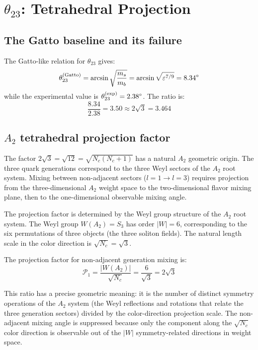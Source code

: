 ﻿\documentclass[prd,twocolumn,showpacs,superscriptaddress,groupedaddress]{revtex4-2}
\begin{document}
\section{$\theta_{23}$: Tetrahedral Projection}

\subsection{The Gatto baseline and its failure}

The Gatto-like relation for $\theta_{23}$ gives:
\begin{equation}
\theta_{23}^{(\rm Gatto)} = \arcsin\sqrt{\frac{m_s}{m_b}} = \arcsin\sqrt{\varepsilon^{7/9}} = 8.34^\circ
\end{equation}
while the experimental value is $\theta_{23}^{(\rm exp)} = 2.38^\circ$. The ratio is:
\begin{equation}
\frac{8.34}{2.38} = 3.50 \approx 2\sqrt{3} = 3.464
\end{equation}

\subsection{$A_2$ tetrahedral projection factor}

The factor $2\sqrt{3} = \sqrt{12} = \sqrt{N_c(N_c+1)}$ has a natural $A_2$ geometric origin. The three quark generations correspond to the three Weyl sectors of the $A_2$ root system. Mixing between non-adjacent sectors ($l = 1 \to l = 3$) requires projection from the three-dimensional $A_2$ weight space to the two-dimensional flavor mixing plane, then to the one-dimensional observable mixing angle.

The projection factor is determined by the Weyl group structure of the $A_2$ root system. The Weyl group $W(A_2) = S_3$ has order $|W| = 6$, corresponding to the six permutations of three objects (the three soliton fields). The natural length scale in the color direction is $\sqrt{N_c} = \sqrt{3}$.

The projection factor for non-adjacent generation mixing is:
\begin{equation}
\mathcal{P}_1 = \frac{|W(A_2)|}{\sqrt{N_c}} = \frac{6}{\sqrt{3}} = 2\sqrt{3}
\label{eq:projection}
\end{equation}

This ratio has a precise geometric meaning: it is the number of distinct symmetry operations of the $A_2$ system (the Weyl reflections and rotations that relate the three generation sectors) divided by the color-direction projection scale. The non-adjacent mixing angle is suppressed because only the component along the $\sqrt{N_c}$ color direction is observable out of the $|W|$ symmetry-related directions in weight space.
\end{document}
